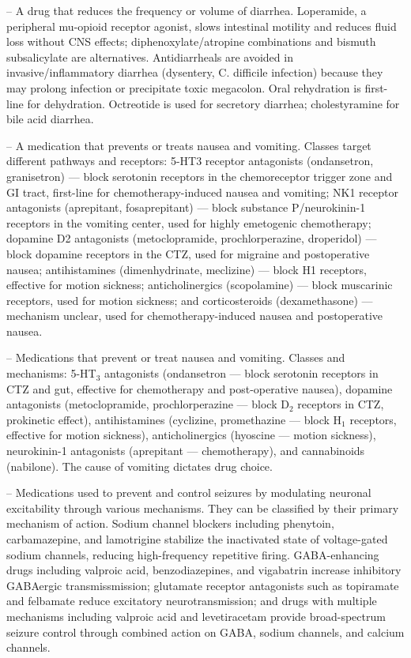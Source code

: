 -- A drug that reduces the frequency or volume of diarrhea. Loperamide, a peripheral mu-opioid receptor agonist, slows intestinal motility and reduces fluid loss without CNS effects; diphenoxylate/atropine combinations and bismuth subsalicylate are alternatives. Antidiarrheals are avoided in invasive/inflammatory diarrhea (dysentery, C. difficile infection) because they may prolong infection or precipitate toxic megacolon. Oral rehydration is first-line for dehydration. Octreotide is used for secretory diarrhea; cholestyramine for bile acid diarrhea.

-- A medication that prevents or treats nausea and vomiting. Classes target different pathways and receptors: 5-HT3 receptor antagonists (ondansetron, granisetron) — block serotonin receptors in the chemoreceptor trigger zone and GI tract, first-line for chemotherapy-induced nausea and vomiting; NK1 receptor antagonists (aprepitant, fosaprepitant) — block substance P/neurokinin-1 receptors in the vomiting center, used for highly emetogenic chemotherapy; dopamine D2 antagonists (metoclopramide, prochlorperazine, droperidol) — block dopamine receptors in the CTZ, used for migraine and postoperative nausea; antihistamines (dimenhydrinate, meclizine) — block H1 receptors, effective for motion sickness; anticholinergics (scopolamine) — block muscarinic receptors, used for motion sickness; and corticosteroids (dexamethasone) — mechanism unclear, used for chemotherapy-induced nausea and postoperative nausea.

-- Medications that prevent or treat nausea and vomiting. Classes and mechanisms: 5-HT$_3$ antagonists (ondansetron — block serotonin receptors in CTZ and gut, effective for chemotherapy and post-operative nausea), dopamine antagonists (metoclopramide, prochlorperazine — block D$_2$ receptors in CTZ, prokinetic effect), antihistamines (cyclizine, promethazine — block H$_1$ receptors, effective for motion sickness), anticholinergics (hyoscine — motion sickness), neurokinin-1 antagonists (aprepitant — chemotherapy), and cannabinoids (nabilone). The cause of vomiting dictates drug choice.

-- Medications used to prevent and control seizures by modulating neuronal excitability through various mechanisms. They can be classified by their primary mechanism of action. Sodium channel blockers including phenytoin, carbamazepine, and lamotrigine stabilize the inactivated state of voltage-gated sodium channels, reducing high-frequency repetitive firing. GABA-enhancing drugs including valproic acid, benzodiazepines, and vigabatrin increase inhibitory GABAergic transmissmission; glutamate receptor antagonists such as topiramate and felbamate reduce excitatory neurotransmission; and drugs with multiple mechanisms including valproic acid and levetiracetam provide broad-spectrum seizure control through combined action on GABA, sodium channels, and calcium channels.

